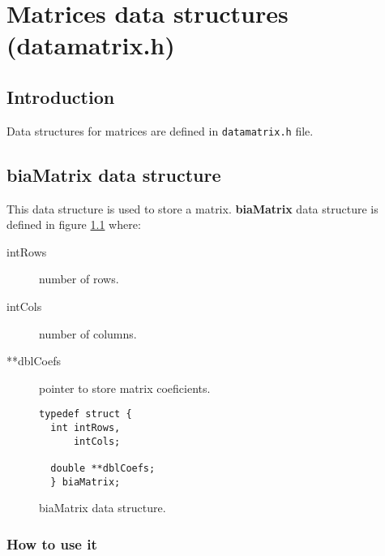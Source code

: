 %
%

\chapter{Matrices data structures (datamatrix.h)}

\section{Introduction}

Data structures for matrices are defined in \texttt{datamatrix.h} file.\\

\section{\textbf{biaMatrix} data structure} \label{sec:biaMatrix}

This data structure is used to store a matrix. \textbf{biaMatrix} data structure is defined in figure \ref{fig:biaMatrix} where:

\begin{description}
\item[intRows] number of rows.
\item[intCols] number of columns.
\item[**dblCoefs] pointer to store matrix coeficients.
\end{description}

\begin{figure}[!h]
\begin{verbatim}
typedef struct {
  int intRows,
      intCols;

  double **dblCoefs;
  } biaMatrix;   
\end{verbatim}
\caption{biaMatrix data structure.} \label{fig:biaMatrix}
\end{figure}

\FloatBarrier

\subsection{How to use it}
